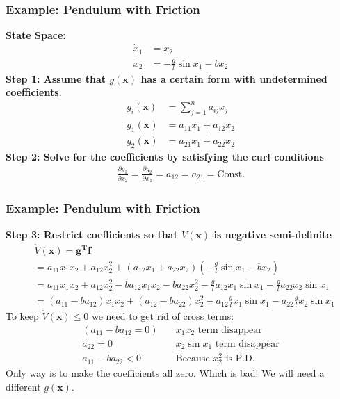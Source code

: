 \documentclass[11pt,handout]{beamer}   %
\begin{document}
\begin{frame}
\frametitle{Example: Pendulum with Friction}
\small
\textbf{State Space:}
\begin{equation*}
\begin{aligned}
\dot{x}_1 &= x_2\\
\dot{x}_2 &= -\frac{g}{l}\sin x_1 - b x_2
\end{aligned}
\end{equation*}
\textbf{Step 1: Assume that $g(\mathbf{x})$ has a certain form with undetermined coefficients.}\\
\begin{equation*}
\begin{aligned}
g_i(\mathbf{x}) &= \sum_{j=1}^{n} a_{ij} x_j\\
g_1(\mathbf{x}) &= a_{11} x_1 + a_{12} x_2\\
g_2(\mathbf{x}) &= a_{21} x_1 + a_{22} x_2
\end{aligned}
\end{equation*}
\textbf{Step 2: Solve for the coefficients by satisfying the curl conditions}
\begin{equation*}
\begin{aligned}
\frac{\partial g_1}{\partial x_2} = \frac{\partial g_2}{\partial x_1} = a_{12} = a_{21} = \textrm{Const.}
\end{aligned}
\end{equation*}
\end{frame}

\begin{frame}
\frametitle{Example: Pendulum with Friction}
\small
\textbf{Step 3: Restrict coefficients so that $\dot{V}(\mathbf{x})$ is negative semi-definite}
\begin{equation*}
\begin{aligned}
&\dot{V}(\mathbf{x}) = \mathbf{g^T f}\\
&= a_{11} x_1 x_2 + a_{12} x_2^2 + ( a_{12} x_1 + a_{22} x_2 ) ( - \frac{g}{l} \sin x_1 - b x_2)\\
&= a_{11} x_1 x_2 + a_{12} x_2^2 - b a_{12} x_1 x_2 - b a_{22} x_2^2 - \frac{g}{l} a_{12} x_1 \sin x_1 - \frac{g}{l} a_{22} x_2 \sin x_1\\
&=(a_{11}-b a_{12}) x_1 x_2 + (a_{12}-b a_{22}) x_2^2 - a_{12} \frac{g}{l} x_1 \sin x_1 - a_{22} \frac{g}{l} x_2 \sin x_1
\end{aligned}
\end{equation*}
To keep $\dot{V}(\mathbf{x}) \leq 0$ we need to get rid of cross terms:
\begin{equation*}
\begin{aligned}
(a_{11} - b a_{12} = 0) & \quad \text{$x_1 x_2$ term disappear} \\
a_{22} = 0 & \quad \text{$x_2 \sin x_1$ term disappear}\\
a_{11} - b a_{22} < 0 & \quad  \text{Because $x_2^2$ is P.D.}
\end{aligned}
\end{equation*}
Only way is to make the coefficients all zero. Which is bad! We will need a different $g(\mathbf{x})$.
\end{frame}
\end{document}

